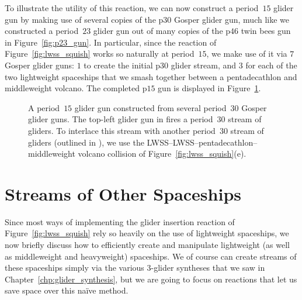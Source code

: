 To illustrate the utility of this reaction, we can now construct a period~$15$ glider gun by making use of several copies of the p$30$ Gosper glider gun, much like we constructed a period~$23$ glider gun out of many copies of the p$46$ twin bees gun in Figure~\ref{fig:p23_gun}. In particular, since the reaction of Figure~\ref{fig:lwss_squish} works so naturally at period~$15$, we make use of it via $7$ Gosper glider guns: $1$ to create the initial p$30$ glider stream, and $3$ for each of the two lightweight spaceships that we smash together between a pentadecathlon and middleweight volcano. The completed p$15$ gun is displayed in Figure~\ref{fig:p15_gun}.

\begin{figure}[!ht]
	\centering
	\caption{A period~$15$ glider gun constructed from several period~$30$ Gosper glider guns. The top-left glider gun in  fires a period~$30$ stream of gliders. To interlace this stream with another period~$30$ stream of gliders (outlined in ), we use the LWSS--LWSS--pentadecathlon--middleweight volcano collision of Figure~\ref{fig:lwss_squish}(e).}\label{fig:p15_gun}
\end{figure}




\section{Streams of Other Spaceships}

Since most ways of implementing the glider insertion reaction of Figure~\ref{fig:lwss_squish} rely so heavily on the use of lightweight spaceships, we now briefly discuss how to efficiently create and manipulate lightweight (as well as middleweight and heavyweight) spaceships. We of course can create streams of these spaceships simply via the various $3$-glider syntheses that we saw in Chapter~\ref{chp:glider_synthesis}, but we are going to focus on reactions that let us save space over this na\"ive method.

